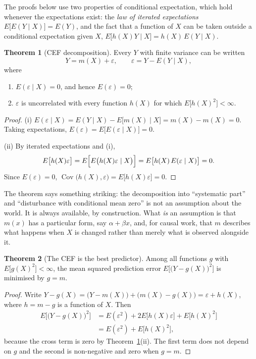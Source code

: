 \documentclass[11pt,a4paper]{article}
\numberwithin{equation}{section}
\DeclareMathOperator{\Cov}{Cov}
\theoremstyle{definition}
\newtheorem{thm}{Theorem}[subsection]
\begin{document}
The proofs below use two properties of conditional expectation, which hold whenever the expectations exist: the \emph{law of iterated
expectations} $E\bigl[E(Y \mid X)\bigr] = E(Y)$, and the fact that a function of $X$ can be taken outside a conditional expectation given $X$,
$E\bigl[h(X) Y \mid X\bigr] = h(X)\, E(Y \mid X)$.

\begin{thm}[CEF decomposition]
\label{thm:cefdecomp}
Every $Y$ with finite variance can be written
\[
Y = m(X) + \varepsilon , \qquad \varepsilon = Y - E(Y \mid X),
\]
where
\begin{enumerate}[label=(\roman*)]
\item $E(\varepsilon \mid X) = 0$, and hence $E(\varepsilon) = 0$;
\item $\varepsilon$ is uncorrelated with every function $h(X)$ for which $E\bigl[h(X)^2\bigr] < \infty$.
\end{enumerate}
\end{thm}

\begin{proof}
(i) $E(\varepsilon \mid X) = E(Y \mid X) - E\bigl[m(X) \mid X\bigr] = m(X) - m(X) = 0$. Taking expectations,
$E(\varepsilon) = E\bigl[E(\varepsilon \mid X)\bigr] = 0$.

(ii) By iterated expectations and (i),
\[
E\bigl[h(X)\varepsilon\bigr] = E\Bigl[E\bigl(h(X)\varepsilon \mid X\bigr)\Bigr] = E\bigl[h(X)\, E(\varepsilon \mid X)\bigr] = 0 .
\]
Since $E(\varepsilon) = 0$, $\Cov\bigl(h(X), \varepsilon\bigr) = E\bigl[h(X)\varepsilon\bigr] = 0$.
\end{proof}

The theorem says something striking: the decomposition into ``systematic part'' and ``disturbance with conditional mean zero'' is not an
assumption about the world. It is always available, by construction. What \emph{is} an assumption is that $m(x)$ has a particular form, say
$\alpha + \beta x$, and, for causal work, that $m$ describes what happens when $X$ is changed rather than merely what is observed alongside it.

\begin{thm}[The CEF is the best predictor]
\label{thm:cefbest}
Among all functions $g$ with $E\bigl[g(X)^2\bigr] < \infty$, the mean squared prediction error $E\bigl[\bigl(Y - g(X)\bigr)^2\bigr]$ is minimised by
$g = m$.
\end{thm}

\begin{proof}
Write $Y - g(X) = \bigl(Y - m(X)\bigr) + \bigl(m(X) - g(X)\bigr) = \varepsilon + h(X)$, where $h = m - g$ is a function of $X$. Then
\begin{align*}
E\bigl[\bigl(Y - g(X)\bigr)^2\bigr] &= E(\varepsilon^2) + 2E\bigl[h(X)\varepsilon\bigr] + E\bigl[h(X)^2\bigr]\\
&= E(\varepsilon^2) + E\bigl[h(X)^2\bigr],
\end{align*}
because the cross term is zero by Theorem~\ref{thm:cefdecomp}(ii). The first term does not depend on $g$ and the second is non-negative and
zero when $g = m$.
\end{proof}
\end{document}
